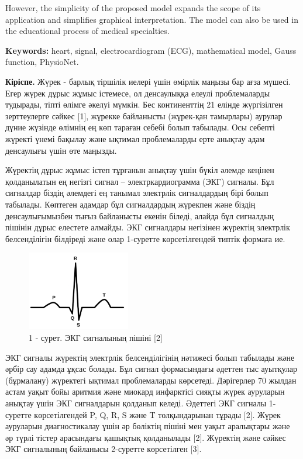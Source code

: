 However, the simplicity of the proposed model expands the scope of its
application and simplifies graphical interpretation. The model can also
be used in the educational process of medical specialties.

{\bfseries Keywords:} heart, signal, electrocardiogram (ECG), mathematical
model, Gauss function, PhysioNet.

\begin{multicols}{2}
{\bfseries Кіріспе.} Жүрек - барлық тіршілік иелері үшін өмірлік маңызы бар
ағза мүшесі. Егер жүрек дұрыс жұмыс істемесе, ол денсаулыққа елеулі
проблемаларды тудырады, тіпті өлімге әкелуі мүмкін. Бес континенттің 21
елінде жүргізілген зерттеулерге сәйкес {[}1{]}, жүрекке байланысты
(жүрек-қан тамырлары) аурулар дүние жүзінде өлімнің ең көп тараған
себебі болып табылады. Осы себепті жүректі үнемі бақылау және ықтимал
проблемаларды ерте анықтау адам денсаулығы үшін өте маңызды.

Жүректің дұрыс жұмыс істеп тұрғанын анықтау үшін бүкіл әлемде кеңінен
қолданылатын ең негізгі сигнал -- электркардиограмма (ЭКГ) сигналы. Бұл
сигналдар біздің әлемдегі ең танымал электрлік сигналдардың бірі болып
табылады. Көптеген адамдар бұл сигналдардың жүрекпен және біздің
денсаулығымызбен тығыз байланысты екенін біледі, алайда бұл сигналдың
пішінін дұрыс елестете алмайды. ЭКГ сигналдары негізінен жүректің
электрлік белсенділігін білдіреді және олар 1-суретте көрсетілгендей
типтік формаға ие.
\end{multicols}

\begin{figure}[H]
	\centering
	\includegraphics[width=0.4\textwidth]{media/ict/image40}
	\caption*{1 - сурет. ЭКГ сигналының пішіні {[}2{]}}
\end{figure}

\begin{multicols}{2}
ЭКГ сигналы жүректің электрлік белсенділігінің нәтижесі болып табылады
және әрбір сау адамда ұқсас болады. Бұл сигнал формасындағы әдеттен тыс
ауытқулар (бұрмалану) жүректегі ықтимал проблемаларды көрсетеді.
Дәрігерлер 70 жылдан астам уақыт бойы аритмия және миокард инфарктісі
сияқты жүрек ауруларын анықтау үшін ЭКГ сигналдарын қолданып келеді.
Әдеттегі ЭКГ сигналы 1-суретте көрсетілгендей P, Q, R, S және T
толқындарынан тұрады {[}2{]}. Жүрек ауруларын диагностикалау үшін әр
бөліктің пішіні мен уақыт аралықтары және әр түрлі тістер арасындағы
қашықтық қолданылады {[}2{]}. Жүректің және сәйкес ЭКГ сигналының
байланысы 2-суретте көрсетілген {[}3{]}.
\end{multicols}

